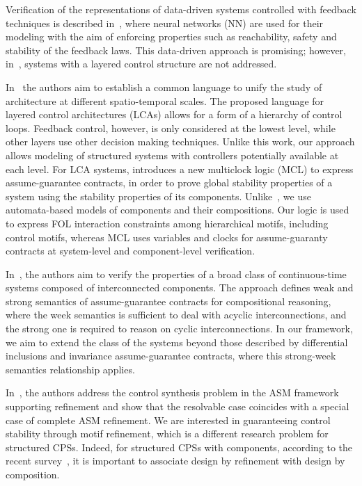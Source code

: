 \documentclass[runningheads]{llncs}
\begin{document}
Verification of the representations of data-driven systems controlled with feedback techniques is described in~\cite{dutta-learning-2018}, where neural networks (NN) are used for their modeling with the aim of enforcing properties such as reachability, safety and stability of the feedback laws.  
This data-driven approach is promising; however, in~\cite{dutta-learning-2018}, systems with a layered control structure are not addressed. 

In~\cite{matni-quantitative-2024} the authors aim to establish a common language to unify the study of architecture at different spatio-temporal scales.
The proposed language for layered control architectures (LCAs) allows for a form of a hierarchy of control loops. Feedback control, however, is only considered at the lowest level, while other layers use other decision making techniques. Unlike this work, our approach allows modeling of structured systems with controllers potentially available at each level.
For LCA systems, \cite{incer-layered-2024} introduces a new multiclock logic (MCL) to express assume-guarantee contracts, in order to prove global stability properties of a system using the stability properties of its components. 
Unlike~\cite{incer-layered-2024}, we use automata-based models of components and their compositions. Our logic is used to express FOL interaction constraints among hierarchical motifs, including control motifs, whereas MCL uses variables and clocks for assume-guaranty contracts at system-level and component-level verification.    

In~\cite{saoud-assume-guarantee-2021}, the authors aim to verify  the properties of a broad class of continuous-time systems composed of interconnected components. The approach defines weak and strong semantics of assume-guarantee contracts for compositional reasoning, where the week semantics is sufficient to deal with acyclic interconnections, and the strong one is required to reason on cyclic interconnections. 
In our framework, we aim to extend the class of the systems beyond those described by differential inclusions and invariance assume-guarantee contracts, where this strong-week semantics relationship applies.  

In~\cite{BanachZSW14}, the authors address the control synthesis problem in the ASM framework supporting refinement  and show that the resolvable case coincides with a special case of complete ASM refinement. We are interested in guaranteeing control stability through motif refinement, which is a different research problem for structured CPSs. Indeed, for structured CPSs with components, according to the recent survey~\cite{CoullonHLR24}, it is important to associate design by refinement with design by composition.
\end{document}
